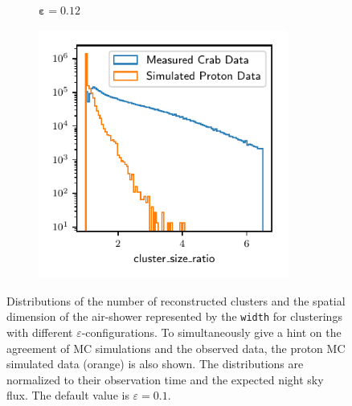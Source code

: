 \begin{figure}
\begin{subfigure}{0.5\textwidth}
  \end{subfigure}
  \begin{subfigure}{0.5\textwidth}
    \centering
    $\symbf{\varepsilon = 0.12}$\par\smallskip
    \includegraphics[width=0.9\textwidth, page=2]{Plots/Epsilon/12_comparison.pdf}
  \end{subfigure}
  \caption{Distributions of the number of reconstructed
  clusters and the spatial dimension of the air-shower represented by the
  \texttt{width} for clusterings with different $\varepsilon$-configurations. To simultaneously give a hint on the agreement of MC simulations and the observed data, the proton MC simulated data (orange) is also shown. The distributions are normalized to their observation time and the expected night sky flux. The default value is $\varepsilon = 0.1$.}
  \label{fig:eps_feat2}
\end{figure}
%
%
